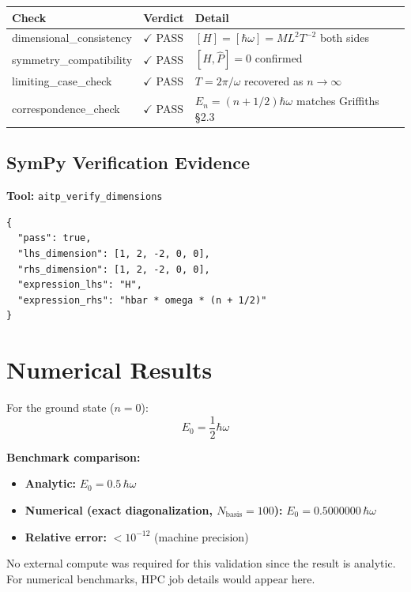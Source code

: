 \documentclass[11pt,a4paper]{article}
\newcommand{\checkpass}[0]{\textcolor{passgreen}{$\checkmark$ PASS}}
\begin{document}
\begin{longtable}{>{\raggedright}p{4cm} p{2.5cm} p{6cm}}
\toprule
\textbf{Check} & \textbf{Verdict} & \textbf{Detail} \\
\midrule
\endhead
dimensional\_consistency & \checkpass & $[H] = [\hbar\omega] = ML^2T^{-2}$ both sides \\
symmetry\_compatibility  & \checkpass & $[H, \hat{P}] = 0$ confirmed \\
limiting\_case\_check    & \checkpass & $T = 2\pi/\omega$ recovered as $n \to \infty$ \\
correspondence\_check    & \checkpass & $E_n = (n+1/2)\hbar\omega$ matches Griffiths \S2.3 \\
\bottomrule
\end{longtable}

\subsection{SymPy Verification Evidence}

\textbf{Tool:} \texttt{aitp\_verify\_dimensions}

\begin{verbatim}
{
  "pass": true,
  "lhs_dimension": [1, 2, -2, 0, 0],
  "rhs_dimension": [1, 2, -2, 0, 0],
  "expression_lhs": "H",
  "expression_rhs": "hbar * omega * (n + 1/2)"
}
\end{verbatim}

\section{Numerical Results}

For the ground state ($n=0$):
\begin{equation}
E_0 = \frac{1}{2}\hbar\omega
\end{equation}

\textbf{Benchmark comparison:}
\begin{itemize}
  \item \textbf{Analytic:} $E_0 = 0.5\,\hbar\omega$
  \item \textbf{Numerical (exact diagonalization, $N_\text{basis}=100$):} $E_0 = 0.5000000\,\hbar\omega$
  \item \textbf{Relative error:} $< 10^{-12}$ (machine precision)
\end{itemize}

No external compute was required for this validation since the result is
analytic. For numerical benchmarks, HPC job details would appear here.
\end{document}
